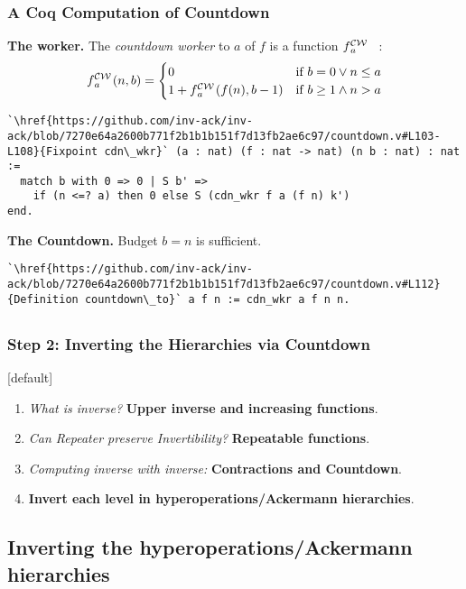 \begin{frame}[fragile]
\frametitle{A Coq Computation of Countdown}

\textbf{The worker.}
The \emph{countdown worker}
to $a$ of $f$ is a function $\cdw{f}{a}$~~:
\begin{equation*}
\cdw{f}{a}(n, b) = \begin{cases}
0 & \text{if } b = 0 \vee n\le a \\ 1 +\cdw{f}{a}(f(n), b-1) & \text{if } b \ge 1 \wedge n > a
\end{cases}
\end{equation*}

\begin{lstlisting}
`\href{https://github.com/inv-ack/inv-ack/blob/7270e64a2600b771f2b1b1b151f7d13fb2ae6c97/countdown.v#L103-L108}{Fixpoint cdn\_wkr}` (a : nat) (f : nat -> nat) (n b : nat) : nat :=
  match b with 0 => 0 | S b' =>
    if (n <=? a) then 0 else S (cdn_wkr f a (f n) k')
end.
\end{lstlisting}

\bigskip

\textbf{The Countdown.} Budget $b = n$ is sufficient.
\begin{lstlisting}
`\href{https://github.com/inv-ack/inv-ack/blob/7270e64a2600b771f2b1b1b151f7d13fb2ae6c97/countdown.v#L112}{Definition countdown\_to}` a f n := cdn_wkr a f n n.
\end{lstlisting}
\end{frame}




\subsection*{}
\begin{frame}
\frametitle{Step 2: Inverting the Hierarchies via \textbf{Countdown}}
[default]

\begin{enumerate}[\bfseries 1.]
	\itemsep 3ex
	\item<done@1->
	\emph{What is inverse?} \textbf{Upper inverse and increasing functions}.
	
	\item<done@1->
	\emph{Can Repeater preserve Invertibility?} \textbf{Repeatable functions}.
	
	\item<done@1->
	\emph{Computing inverse with inverse:} \textbf{Contractions and Countdown}.
	
	\item<come@2->
	\textbf{Invert each level in hyperoperations/Ackermann hierarchies}.
\end{enumerate}
\end{frame}


\subsection{Inverting the hyperoperations/Ackermann hierarchies}

